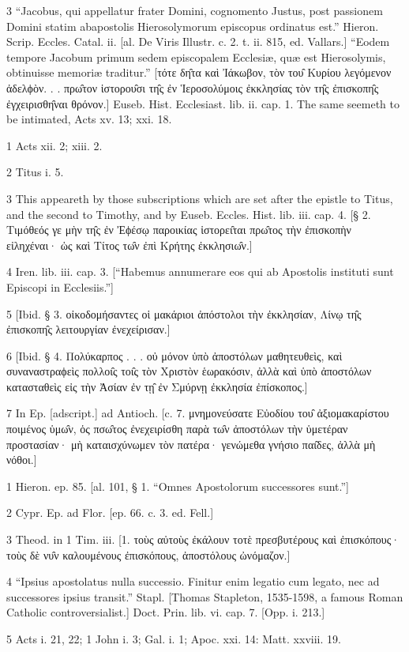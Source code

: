 3
“Jacobus, qui appellatur frater Domini, cognomento Justus, post passionem Domini statim abapostolis Hierosolymorum episcopus ordinatus est.” Hieron. Scrip. Eccles. Catal. ii. [al. De Viris Illustr. c. 2. t. ii. 815, ed. Vallars.] “Eodem tempore Jacobum primum sedem episcopalem Ecclesiæ, quæ est Hierosolymis, obtinuisse memoriæ traditur.” [τότε δη̑τα καὶ Ἰάκωβον, τὸν του̑ Κυρίου λεγόμενον ἀδελϕὸν. . . πρω̑τον ἱστορου̑σι τη̑ς ἐν Ἱεροσολύμοις ἐκκλησίας τὸν τη̑ς ἐπισκοπη̑ς ἐγχειρισθη̑ναι θρόνον.] Euseb. Hist. Ecclesiast. lib. ii. cap. 1. The same seemeth to be intimated, Acts xv. 13; xxi. 18.

1
Acts xii. 2; xiii. 2.

2
Titus i. 5.

3
This appeareth by those subscriptions which are set after the epistle to Titus, and the second to Timothy, and by Euseb. Eccles. Hist. lib. iii. cap. 4. [§ 2. Τιμόθεός γε μὴν τη̑ς ἐν Ἐϕέσῳ παροικίας ἱστορει̑ται πρω̑τος τὴν ἐπισκοπὴν εἰληχέναι· ὡς καὶ Τίτος τω̑ν ἐπὶ Κρήτης ἐκκλησιω̑ν.]

4
Iren. lib. iii. cap. 3. [“Habemus annumerare eos qui ab Apostolis instituti sunt Episcopi in Ecclesiis.”]

5
[Ibid. § 3. οἰκοδομήσαντες οἱ μακάριοι ἀπόστολοι τὴν ἐκκλησίαν, Λίνῳ τη̑ς ἐπισκοπη̑ς λειτουργίαν ἐνεχείρισαν.]

6
[Ibid. § 4. Πολύκαρπος . . . οὐ μόνον ὑπὸ ἀποστόλων μαθητευθεὶς, καὶ συναναστραϕεὶς πολλοι̑ς τοι̑ς τὸν Χριστὸν ἑωρακόσιν, ἀλλὰ καὶ ὑπὸ ἀποστόλων κατασταθεὶς εἰς τὴν Ἀσίαν ἐν τῃ̑ ἐν Σμύρνῃ ἐκκλησία ἐπίσκοπος.]

7
In Ep. [adscript.] ad Antioch. [c. 7. μνημονεύσατε Εὐοδίου του̑ ἀξιομακαρίστου ποιμένος ὑμω̑ν, ὁς πσω̑τος ἐνεχειρίσθη παρὰ τω̑ν ἀποστόλων τὴν ὑμετέραν προστασίαν· μὴ καταισχύνωμεν τὸν πατέρα· γενώμεθα γνήσιο παι̑δες, ἀλλὰ μὴ νόθοι.]

1
Hieron. ep. 85. [al. 101, § 1. “Omnes Apostolorum successores sunt.”]

2
Cypr. Ep. ad Flor. [ep. 66. c. 3. ed. Fell.]

3
Theod. in 1 Tim. iii. [1. τοὺς αὐτοὺς ἐκάλουν τοτὲ πρεσβυτέρους καὶ ἐπισκόπους· τοὺς δὲ νυ̑ν καλουμένους ἐπισκόπους, ἀποστόλους ὠνόμαζον.]

4
“Ipsius apostolatus nulla successio. Finitur enim legatio cum legato, nec ad successores ipsius transit.” Stapl. [Thomas Stapleton, 1535-1598, a famous Roman Catholic controversialist.] Doct. Prin. lib. vi. cap. 7. [Opp. i. 213.]

5
Acts i. 21, 22; 1 John i. 3; Gal. i. 1; Apoc. xxi. 14: Matt. xxviii. 19.

